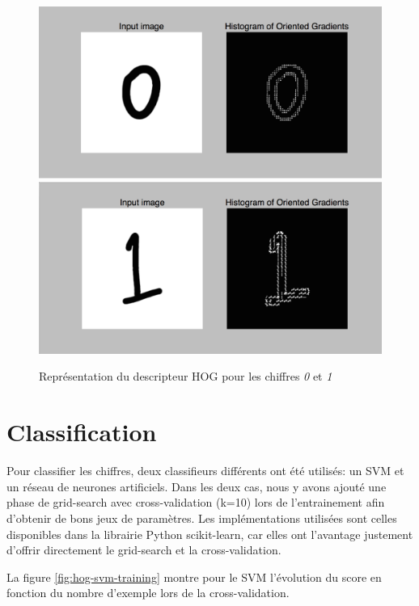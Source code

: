 \begin{figure}[!h]
\includegraphics[width=\textwidth]{pictures/hog0}
\includegraphics[width=\textwidth]{pictures/hog1}
\caption{Représentation du descripteur HOG pour les chiffres \emph{0} et \emph{1}}
\label{fig:hog}
\end{figure}

\section{Classification}

Pour classifier les chiffres, deux classifieurs différents ont été utilisés: un SVM et un réseau de neurones artificiels. Dans les deux cas, nous y avons ajouté une phase de grid-search avec cross-validation (k=10) lors de l'entrainement afin d'obtenir de bons jeux de paramètres. Les implémentations utilisées sont celles disponibles dans la librairie Python scikit-learn, car elles ont l'avantage justement d'offrir directement le grid-search et la cross-validation.

La figure \vref{fig:hog-svm-training} montre pour le SVM l'évolution du score en fonction du nombre d'exemple lors de la cross-validation.

